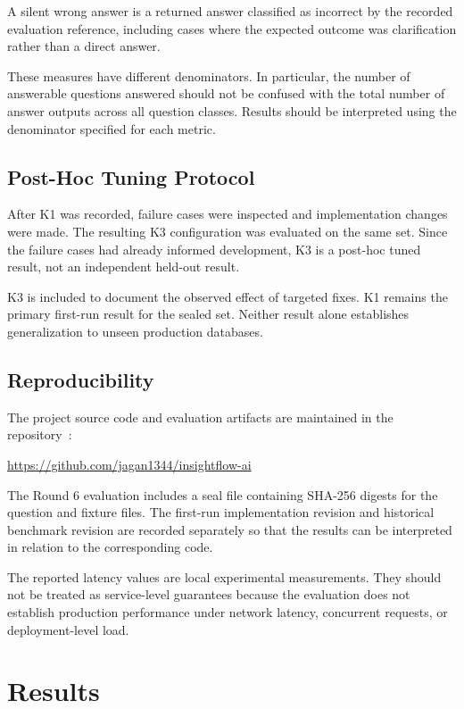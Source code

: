 \documentclass[conference]{IEEEtran}
\begin{document}
A silent wrong answer is a returned answer classified as incorrect by the recorded evaluation reference, including cases where the expected outcome was clarification rather than a direct answer.

These measures have different denominators. In particular, the number of answerable questions answered should not be confused with the total number of answer outputs across all question classes. Results should be interpreted using the denominator specified for each metric.

\subsection{Post-Hoc Tuning Protocol}

After K1 was recorded, failure cases were inspected and implementation changes were made. The resulting K3 configuration was evaluated on the same set. Since the failure cases had already informed development, K3 is a post-hoc tuned result, not an independent held-out result.

K3 is included to document the observed effect of targeted fixes. K1 remains the primary first-run result for the sealed set. Neither result alone establishes generalization to unseen production databases.

\subsection{Reproducibility}

The project source code and evaluation artifacts are maintained in the repository~\cite{insightflowrepo}:

\url{https://github.com/jagan1344/insightflow-ai}

The Round 6 evaluation includes a seal file containing SHA-256 digests for the question and fixture files. The first-run implementation revision and historical benchmark revision are recorded separately so that the results can be interpreted in relation to the corresponding code.

The reported latency values are local experimental measurements. They should not be treated as service-level guarantees because the evaluation does not establish production performance under network latency, concurrent requests, or deployment-level load.

\section{Results}
\end{document}
